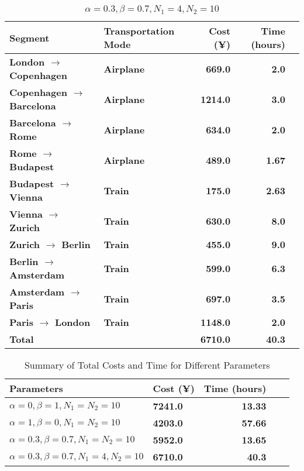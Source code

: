 \documentclass{article}
\begin{document}
\begin{table}[!ht]
    \centering
    \begin{tabular}{>{\bfseries}l>{\bfseries}l>{\bfseries}r>{\bfseries}r>{\bfseries}r}
      \toprule
      Segment                          & Transportation Mode & Cost (¥) & Time (hours) \\
      \midrule
      London $\rightarrow$  Copenhagen & Airplane            & 669.0    & 2.0          \\
      Copenhagen $\rightarrow$  Barcelona & Airplane          & 1214.0   & 3.0          \\
      Barcelona $\rightarrow$  Rome     & Airplane            & 634.0    & 2.0          \\
      Rome $\rightarrow$  Budapest     & Airplane            & 489.0    & 1.67         \\
      Budapest $\rightarrow$  Vienna    & Train               & 175.0    & 2.63         \\
      Vienna $\rightarrow$  Zurich      & Train               & 630.0    & 8.0          \\
      Zurich $\rightarrow$  Berlin      & Train               & 455.0    & 9.0          \\
      Berlin $\rightarrow$  Amsterdam   & Train               & 599.0    & 6.3          \\
      Amsterdam $\rightarrow$  Paris    & Train               & 697.0    & 3.5          \\
      Paris $\rightarrow$  London       & Train               & 1148.0   & 2.0          \\
      \midrule
      Total                            &                     & 6710.0   & 40.3         \\
      \bottomrule
    \end{tabular}
    \caption{$\alpha=0.3, \beta=0.7, N_1=4, N_2=10$}%
    \label{tab:alpha0.3beta0.7N14}
  \end{table}

  \begin{table}[!ht]
    \centering
    \begin{tabular}{>{\bfseries}l>{\bfseries}l>{\bfseries}r>{\bfseries}r>{\bfseries}r}
      \toprule
      Parameters    & Cost (¥) & Time (hours) \\
      \midrule
      $\alpha=0, \beta=1, N_1=N_2=10$               & 7241.0   & 13.33        \\
      $\alpha=1, \beta=0, N_1=N_2=10$   & 4203.0   & 57.66        \\
      $\alpha=0.3, \beta=0.7, N_1=N_2=10$             & 5952.0   & 13.65        \\
      $\alpha=0.3, \beta=0.7, N_1=4, N_2=10$  & 6710.0   & 40.3         \\
      \bottomrule
    \end{tabular}
    \caption{Summary of Total Costs and Time for Different Parameters}%
    \label{tab:summary}
  \end{table}
\end{document}
